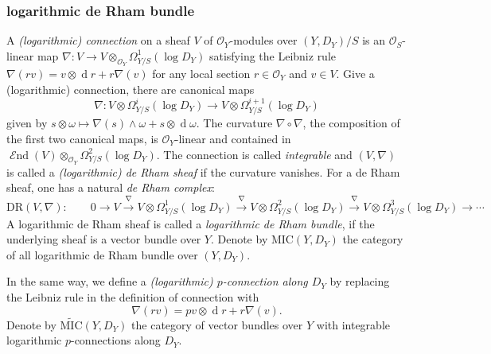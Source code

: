\documentclass[12pt,twoside]{book}
\theoremstyle{plain}
\theoremstyle{definition}
\theoremstyle{remark}
\newcommand{\mO}{{\mathcal O}}
\DeclareMathOperator\rmd{d}
\DeclareMathOperator\mEnd{\mathcal End}
\newcommand{\MIC}{\mathrm{MIC}}
\numberwithin{equation}{section}
\def\DR{{\mathrm{DR}}}
\begin{document}
\subsubsection{logarithmic de Rham bundle}
A \emph{(logarithmic) connection} on a sheaf $V$ of $\mO_Y$-modules over $(Y,D_Y)/S$ is an $\mO_S$-linear map $\nabla\colon V\rightarrow V\otimes_{\mO_Y} \Omega_{Y/S}^1(\log D_Y)$ satisfying the Leibniz rule $\nabla(rv) = v\otimes \rmd r + r\nabla(v)$ for any local section $r\in \mO_Y$ and $v\in V$. Give a (logarithmic) connection, there are canonical maps
\[\nabla\colon V\otimes\Omega_{Y/S}^i(\log D_Y) \rightarrow V\otimes\Omega_{Y/S}^{i+1}(\log D_Y)\]
given by $s\otimes \omega \mapsto\nabla(s)\wedge \omega +s \otimes \rmd\omega$.
The curvature $\nabla\circ\nabla$, the composition of the first two canonical maps, is $\mO_Y$-linear and contained in $\mEnd(V)\otimes_{\mO_Y} \Omega^2_{Y/S}(\log D_Y)$. The connection is called \emph{integrable} and $(V,\nabla)$ is called a \emph{(logarithmic) de Rham sheaf} if the curvature vanishes. For a de Rham sheaf, one has a natural \emph{de Rham complex}:
\[\DR(V,\nabla):\qquad 0\rightarrow V
\xrightarrow{\nabla} V\otimes\Omega^1_{Y/S}(\log D_Y)
\xrightarrow{\nabla} V\otimes\Omega^2_{Y/S}(\log D_Y)
\xrightarrow{\nabla} V\otimes\Omega^3_{Y/S}(\log D_Y) \rightarrow \cdots \]
A logarithmic de Rham sheaf is called a \emph{logarithmic de Rham bundle}, if the underlying sheaf is a vector bundle over $Y$. Denote by \emph{$\MIC(Y,D_Y)$} the category of all logarithmic de Rham bundle over $(Y,D_Y)$.

In the same way, we define a \emph{(logarithmic) $p$-connection along $D_Y$} by replacing the Leibniz rule in the definition of connection with
\[\nabla(rv) = pv\otimes \rmd r + r\nabla(v).\]
Denote by \emph{$\widetilde{\MIC}(Y,D_Y)$} the category of vector bundles over $Y$ with integrable logarithmic $p$-connections along $D_Y$.
\end{document}
